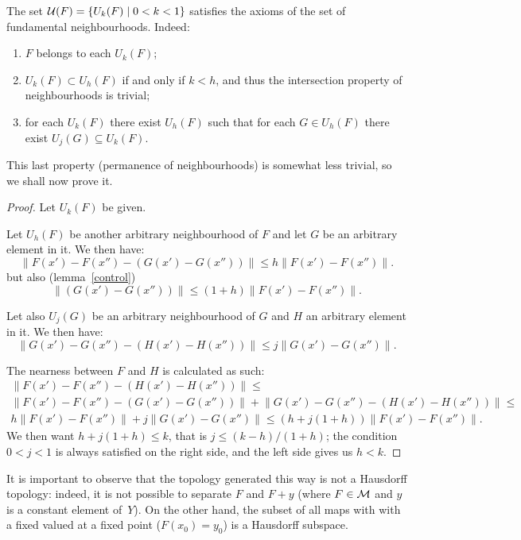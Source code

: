 \documentclass[12pt]{article}
\theoremstyle{normale}
\theoremstyle{liscio}
\providecommand{\norm}[1]{\lVert#1\rVert}
\begin{document}
The set $\mathcal{U}(F) = \{ U_k(F) \mid 0<k<1 \}$ satisfies the axioms of
the set of fundamental neighbourhoods. Indeed:
\begin{enumerate}
\item $F$ belongs to each $U_k(F)$;
\item $U_k(F) \subset U_h(F)$ if and only if $k < h$, and thus the
intersection property of neighbourhoods is trivial;
\item for each $U_k(F)$ there exist $U_h(F)$ such that for each $G
\in U_h(F)$ there exist $U_j(G) \subseteq U_k(F)$.
\end{enumerate}

This last property (permanence of neighbourhoods) is somewhat less
trivial, so we shall now prove it.
\begin{proof}
Let $U_k(F)$ be given.

 Let $U_h(F)$ be another arbitrary neighbourhood of $F$ and let
$G$ be an arbitrary element in it. We then have:
\begin{equation}\label{g}
\norm{F(x') - F(x'') - (G(x')-G(x''))} \le h \norm{F(x') - F(x'')}.
\end{equation}
but also (lemma~\ref{control})
\begin{equation}\label{g}
\norm{(G(x')-G(x''))} \le (1+h) \norm{F(x') - F(x'')}.
\end{equation}

Let also $U_j(G)$ be an arbitrary neighbourhood of $G$ and $H$ an
arbitrary element in it. We then have:
\begin{equation}\label{h}
\norm{G(x') - G(x'') - (H(x')-H(x''))} \le j \norm{G(x') - G(x'')}.
\end{equation}

The nearness between $F$ and $H$ is calculated as such:
\begin{multline}\label{h}
\norm{F(x') - F(x'') - (H(x')-H(x''))} \le \\
\norm{F(x') - F(x'') - (G(x')-G(x''))} +
\norm{G(x') - G(x'') - (H(x')-H(x''))} \le \\
h \norm{F(x') - F(x'')} + j \norm{G(x') - G(x'')} \le
(h + j (1+h)) \norm{F(x') - F(x'')}.
\end{multline}
We then want $h + j (1 + h) \le k$, that is $j \le (k-h)/(1+h)$;
the condition $0<j<1$ is always satisfied on the right side, and
the left side gives us $h<k$.
\end{proof}

It is important to observe that the topology generated this way is
not a Hausdorff topology: indeed, it is not possible to separate
$F$ and $F+y$ (where $F\in\mathcal{M}$ and $y$ is a constant element of~$Y$).
On the other hand, the subset of all maps with with a fixed valued
at a fixed point ($F(x_0) = y_0$) is a Hausdorff subspace.
\end{document}
